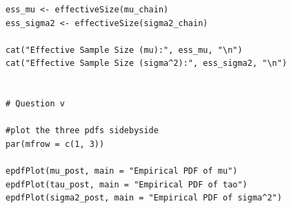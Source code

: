 \documentclass[]{article}
\begin{document}
\begin{lstlisting}
ess_mu <- effectiveSize(mu_chain)
ess_sigma2 <- effectiveSize(sigma2_chain)

cat("Effective Sample Size (mu):", ess_mu, "\n")
cat("Effective Sample Size (sigma^2):", ess_sigma2, "\n")


# Question v

#plot the three pdfs sidebyside
par(mfrow = c(1, 3))

epdfPlot(mu_post, main = "Empirical PDF of mu")
epdfPlot(tau_post, main = "Empirical PDF of tao")
epdfPlot(sigma2_post, main = "Empirical PDF of sigma^2")

\end{lstlisting}
\end{document}
